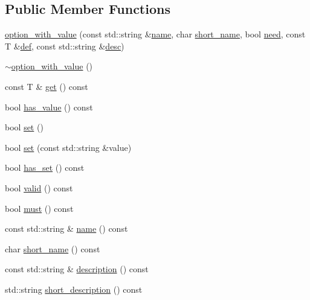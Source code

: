 \subsection*{Public Member Functions}
\begin{DoxyCompactItemize}
\item 
\mbox{\hyperlink{classcmdline_1_1parser_1_1option__with__value_a5cfab4623041433b5a5a7f211eee23c9}{option\+\_\+with\+\_\+value}} (const std\+::string \&\mbox{\hyperlink{classcmdline_1_1parser_1_1option__with__value_a37a101909b8d912d9cab296be19328da}{name}}, char \mbox{\hyperlink{classcmdline_1_1parser_1_1option__with__value_a2ebacba0864e4473cefc8a4a967f4ab1}{short\+\_\+name}}, bool \mbox{\hyperlink{classcmdline_1_1parser_1_1option__with__value_adb73da6126c1ea28a2375c5b94ece4c6}{need}}, const T \&\mbox{\hyperlink{classcmdline_1_1parser_1_1option__with__value_a0d856f6886e383f0fe2407a95c5f590b}{def}}, const std\+::string \&\mbox{\hyperlink{classcmdline_1_1parser_1_1option__with__value_aab2cea1b63e3d310e10d00810d91ddb0}{desc}})
\item 
\mbox{\hyperlink{classcmdline_1_1parser_1_1option__with__value_a58b664530840bd743fc559cf84b93b9d}{$\sim$option\+\_\+with\+\_\+value}} ()
\item 
const T \& \mbox{\hyperlink{classcmdline_1_1parser_1_1option__with__value_aa7d8a57e2ad1aa3733098781d351af0a}{get}} () const
\item 
bool \mbox{\hyperlink{classcmdline_1_1parser_1_1option__with__value_a4bf8da186590bb770ea1d29cff75ec19}{has\+\_\+value}} () const
\item 
bool \mbox{\hyperlink{classcmdline_1_1parser_1_1option__with__value_a6bdd4adfe3afff3fe0d0c57d2259a969}{set}} ()
\item 
bool \mbox{\hyperlink{classcmdline_1_1parser_1_1option__with__value_a295815e19351f027fdbdcf00d46187d1}{set}} (const std\+::string \&value)
\item 
bool \mbox{\hyperlink{classcmdline_1_1parser_1_1option__with__value_aafe60a7f6f3e8a6928517382689e4867}{has\+\_\+set}} () const
\item 
bool \mbox{\hyperlink{classcmdline_1_1parser_1_1option__with__value_aae5ed5d511506ab324d203d31abb4a28}{valid}} () const
\item 
bool \mbox{\hyperlink{classcmdline_1_1parser_1_1option__with__value_a3dd668a7784eaa1fdeac77367c81f489}{must}} () const
\item 
const std\+::string \& \mbox{\hyperlink{classcmdline_1_1parser_1_1option__with__value_a37a101909b8d912d9cab296be19328da}{name}} () const
\item 
char \mbox{\hyperlink{classcmdline_1_1parser_1_1option__with__value_a2ebacba0864e4473cefc8a4a967f4ab1}{short\+\_\+name}} () const
\item 
const std\+::string \& \mbox{\hyperlink{classcmdline_1_1parser_1_1option__with__value_ac430403324ef502009880473a5d4c945}{description}} () const
\item 
std\+::string \mbox{\hyperlink{classcmdline_1_1parser_1_1option__with__value_a7ea043466b20ee712439276b8ba888f3}{short\+\_\+description}} () const
\end{DoxyCompactItemize}
